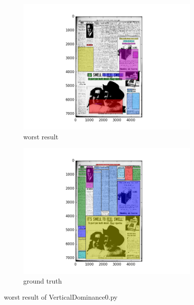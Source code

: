 \documentclass[a4paper,10pt]{article}
\begin{document}
					\begin{figure}
					\centering
					\begin{subfigure}{.5\textwidth}
					  \centering
					  \includegraphics[width=10cm]
					{VerticalDominance0.py.worst.png}
					  \caption{worst result}
					  \label{fig:sub1}
					\end{subfigure}%
					\begin{subfigure}{.5\textwidth}
					  \centering
					  \includegraphics[width=10cm]
					{VerticalDominance0.py.gt.worst.png}
					  \caption{ground truth}
					  \label{fig:sub2}
					\end{subfigure}
					\caption
					{worst result of VerticalDominance0.py}
					\label{fig:test}
					\end{figure}
					
\end{document}

